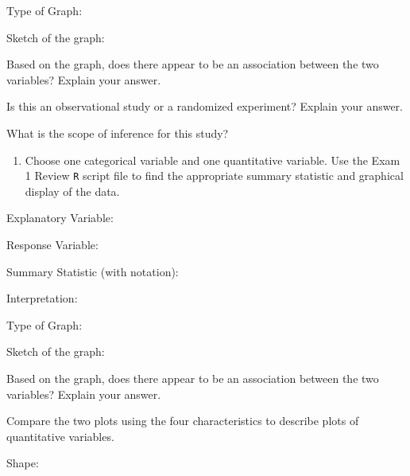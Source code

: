 \documentclass[
]{report}
\providecommand{\tightlist}{%
  \setlength{\itemsep}{0pt}\setlength{\parskip}{0pt}}
\newcommand{\rgi}{\hspace{24pt}}  %
\begin{document}
\rgi Type of Graph:

\vspace{0.3in}

\rgi Sketch of the graph:

\vspace{2in}

\rgi Based on the graph, does there appear to be an association between the two variables? Explain your answer.

\vspace{0.5in}

\rgi Is this an observational study or a randomized experiment? Explain your answer.

\vspace{0.5in}

\rgi What is the scope of inference for this study?

\newpage

\begin{enumerate}
\def\labelenumi{\arabic{enumi}.}
\setcounter{enumi}{6}
\tightlist
\item
  Choose one categorical variable and one quantitative variable. Use the Exam 1 Review \texttt{R} script file to find the appropriate summary statistic and graphical display of the data.
\end{enumerate}

\rgi Explanatory Variable:

\rgi Response Variable:

\rgi Summary Statistic (with notation):

\rgi \rgi Interpretation:

\vspace{0.3in}

\rgi Type of Graph:

\vspace{0.3in}

\rgi Sketch of the graph:

\vspace{1.5in}

\rgi Based on the graph, does there appear to be an association between the two variables? Explain your answer.

\vspace{0.5in}

\rgi Compare the two plots using the four characteristics to describe plots of quantitative variables.

\rgi \rgi Shape:

\vspace{0.2in}
\end{document}
